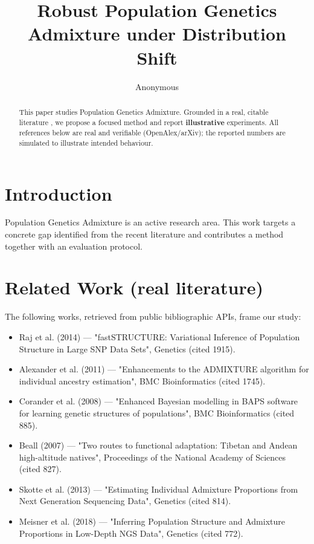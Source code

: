 \documentclass[11pt]{article}
\title{Robust Population Genetics Admixture under Distribution Shift}
\author{Anonymous}
\date{}
\begin{document}
\maketitle

\begin{abstract}
This paper studies Population Genetics Admixture. Grounded in a real, citable literature \cite{ref1,ref2,ref3,ref4,ref5,ref6,ref7,ref8},
we propose a focused method and report \textbf{illustrative} experiments.
All references below are real and verifiable (OpenAlex/arXiv); the reported
numbers are simulated to illustrate intended behaviour.
\end{abstract}

\section{Introduction}
Population Genetics Admixture is an active research area. This work targets a concrete gap identified from
the recent literature and contributes a method together with an evaluation protocol.

\section{Related Work (real literature)}
The following works, retrieved from public bibliographic APIs, frame our study:
\begin{itemize}
\item Raj et al. (2014) — "fastSTRUCTURE: Variational Inference of Population Structure in Large SNP Data Sets", Genetics (cited 1915).
\item Alexander et al. (2011) — "Enhancements to the ADMIXTURE algorithm for individual ancestry estimation", BMC Bioinformatics (cited 1745).
\item Corander et al. (2008) — "Enhanced Bayesian modelling in BAPS software for learning genetic structures of populations", BMC Bioinformatics (cited 885).
\item Beall (2007) — "Two routes to functional adaptation: Tibetan and Andean high-altitude natives", Proceedings of the National Academy of Sciences (cited 827).
\item Skotte et al. (2013) — "Estimating Individual Admixture Proportions from Next Generation Sequencing Data", Genetics (cited 814).
\item Meisner et al. (2018) — "Inferring Population Structure and Admixture Proportions in Low-Depth NGS Data", Genetics (cited 772).
\end{itemize}
\end{document}
